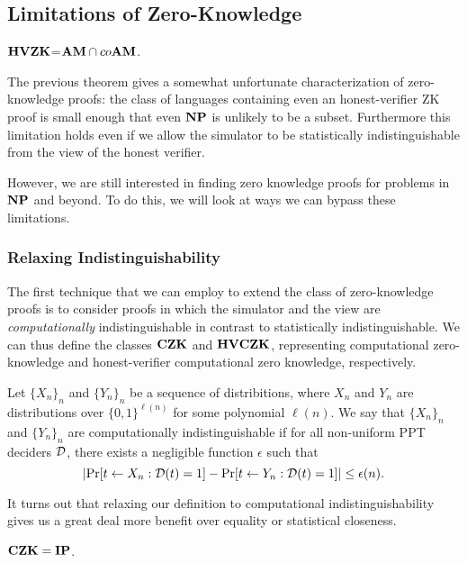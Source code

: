 \subsection{Limitations of Zero-Knowledge}

\begin{theorem}[\cite{10.1145/28395.28418}]
	$\mathbf{HVZK}$=$\mathbf{AM}\cap co\mathbf{AM}$.
\end{theorem}

The previous theorem gives a somewhat unfortunate characterization of zero-knowledge proofs: the class of languages containing even an honest-verifier ZK proof is small enough that even $\mathbf{NP}$ is unlikely to be a subset. Furthermore this limitation holds even if we allow the simulator to be statistically indistinguishable from the view of the honest verifier. 

However, we are still interested in finding zero knowledge proofs for problems in $\mathbf{NP}$ and beyond. To do this, we will look at ways we can bypass these limitations.

\subsubsection{Relaxing Indistinguishability}

The first technique that we can employ to extend the class of zero-knowledge proofs is to consider proofs in which the simulator and the view are \textit{computationally} indistinguishable in contrast to statistically indistinguishable. We can thus define the classes $\mathbf{CZK}$ and $\mathbf{HV}\mathbf{CZK}$, representing computational zero-knowledge and honest-verifier computational zero knowledge, respectively.

\begin{definition}
	Let $\{X_n\}_n$ and $\{Y_n\}_n$ be a sequence of distribitions, where $X_n$ and $Y_n$ are distributions over $\{0,1\}^{\ell(n)}$ for some polynomial $\ell(n)$. We say that $\{X_n\}_n$ and $\{Y_n\}_n$ are computationally indistinguishable if for all non-uniform PPT deciders $\mathcal{D}$, there exists a negligible function $\epsilon$ such that
	$$\left|\Pr[t\leftarrow X_n:\mathcal{D}(t)=1] - \Pr[t\leftarrow Y_n:\mathcal{D}(t)=1]\right|\leq\epsilon(n).$$
\end{definition}

It turns out that relaxing our definition to computational indistinguishability gives us a great deal more benefit over equality or statistical closeness.

\begin{theorem}[\cite{10.5555/646752.704748}]
	$\mathbf{CZK} = \mathbf{IP}$.
\end{theorem}

